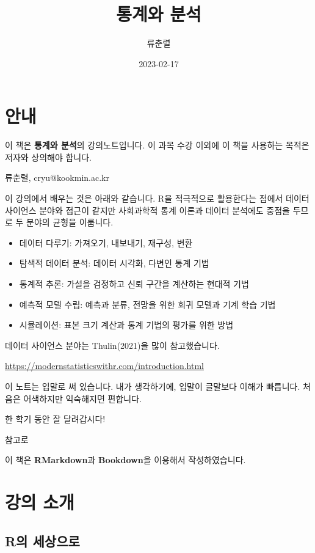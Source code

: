 \documentclass[
]{book}
\title{통계와 분석}
\author{류춘렬}
\date{2023-02-17}
\begin{document}
\maketitle

{
\setcounter{tocdepth}{1}
\tableofcontents
}
\hypertarget{uxc548uxb0b4}{%
\chapter*{안내}\label{uxc548uxb0b4}}

이 책은 \textbf{통계와 분석}의 강의노트입니다. 이 과목 수강 이외에 이 책을 사용하는 목적은 저자와 상의해야 합니다.

류춘렬, cryu@kookmin.ac.kr

이 강의에서 배우는 것은 아래와 같습니다. R을 적극적으로 활용한다는 점에서 데이터 사이언스 분야와 접근이 같지만 사회과학적 통계 이론과 데이터 분석에도 중점을 두므로 두 분야의 균형을 이룹니다.

\begin{itemize}
\item
  데이터 다루기: 가져오기, 내보내기, 재구성, 변환
\item
  탐색적 데이터 분석: 데이터 시각화, 다변인 통계 기법
\item
  통계적 추론: 가설을 검정하고 신뢰 구간을 계산하는 현대적 기법
\item
  예측적 모델 수립: 예측과 분류, 전망을 위한 회귀 모델과 기계 학습 기법
\item
  시뮬레이션: 표본 크기 계산과 통계 기법의 평가를 위한 방법
\end{itemize}

데이터 사이언스 분야는 Thulin(2021)을 많이 참고했습니다.

\url{https://modernstatisticswithr.com/introduction.html}

이 노트는 입말로 써 있습니다. 내가 생각하기에, 입말이 글말보다 이해가 빠릅니다. 처음은 어색하지만 익숙해지면 편합니다.

한 학기 동안 잘 달려갑시다!

참고로

이 책은 \textbf{RMarkdown}과 \textbf{Bookdown}을 이용해서 작성하였습니다.

\hypertarget{uxac15uxc758-uxc18cuxac1c}{%
\chapter{강의 소개}\label{uxac15uxc758-uxc18cuxac1c}}

\hypertarget{ruxc758-uxc138uxc0c1uxc73cuxb85c}{%
\section{R의 세상으로}\label{ruxc758-uxc138uxc0c1uxc73cuxb85c}}
\end{document}
